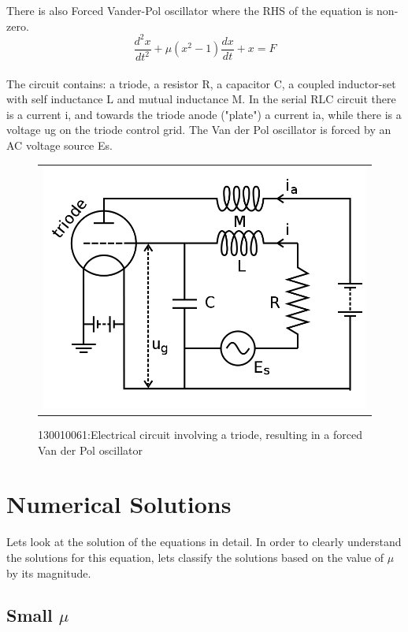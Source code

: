 \documentclass[12pt, a4paper]{report}
\begin{document}
There is also Forced Vander-Pol oscillator where the RHS of the equation is non-zero.
\begin{equation}
\frac{d^2 x}{dt^2}+\mu(x^2-1)\frac{dx}{dt}+x=F
\end{equation}\\
The circuit contains: a triode, a resistor R, a capacitor C, a coupled inductor-set with self inductance L and mutual inductance M. In the serial RLC circuit there is a current i, and towards the triode anode ("plate") a current ia, while there is a voltage ug on the triode control grid. The Van der Pol oscillator is forced by an AC voltage source Es.

\begin{figure}[H]
	\centering
	\begin{tabular} {l}
	\includegraphics[scale=0.3]{vanderpol.png} 
	\end{tabular}
	\caption{130010061:Electrical circuit involving a triode, resulting in a forced Van der Pol oscillator}
\end{figure}
\label{fig1} 

\chapter{Numerical Solutions}
Lets look at the solution of the equations in detail. In order to clearly understand the solutions for this equation, lets classify the solutions based on the value of $\mu$ by its magnitude.

\section{Small $\mu$}
\end{document}

